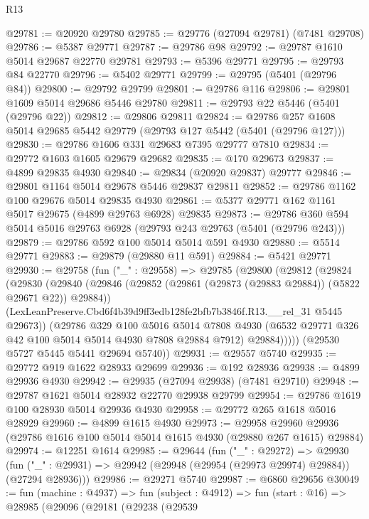 \begin{lexlean}{R13}
\begin{coremodule}
@29781 := @20920 @29780
@29785 := @29776 (@27094 @29781) (@7481 @29708)
@29786 := @5387 @29771
@29787 := @29786 @98
@29792 := @29787 @1610 @5014 @29687 @22770 @29781
@29793 := @5396 @29771
@29795 := @29793 @84 @22770
@29796 := @5402 @29771
@29799 := @29795 (@5401 (@29796 @84))
@29800 := @29792 @29799
@29801 := @29786 @116
@29806 := @29801 @1609 @5014 @29686 @5446 @29780
@29811 := @29793 @22 @5446 (@5401 (@29796 @22))
@29812 := @29806 @29811
@29824 := @29786 @257 @1608 @5014 @29685 @5442 @29779 (@29793 @127 @5442 (@5401 (@29796 @127)))
@29830 := @29786 @1606 @331 @29683 @7395 @29777 @7810
@29834 := @29772 @1603 @1605 @29679 @29682
@29835 := @170 @29673
@29837 := @4899 @29835 @4930
@29840 := @29834 (@20920 @29837) @29777
@29846 := @29801 @1164 @5014 @29678 @5446 @29837 @29811
@29852 := @29786 @1162 @100 @29676 @5014 @29835 @4930
@29861 := @5377 @29771 @162 @1161 @5017 @29675 (@4899 @29763 @6928) @29835
@29873 := @29786 @360 @594 @5014 @5016 @29763 @6928 (@29793 @243 @29763 (@5401 (@29796 @243)))
@29879 := @29786 @592 @100 @5014 @5014 @591 @4930
@29880 := @5514 @29771
@29883 := @29879 (@29880 @11 @591)
@29884 := @5421 @29771
@29930 := @29758
    (fun ("_" : @29558) =>
    @29785
      (@29800
        (@29812
          (@29824
            (@29830
              (@29840
                (@29846 (@29852 (@29861 (@29873 (@29883 @29884)) (@5822 @29671 @22)) @29884))
                (LexLeanPreserve.Cbd6f4b39d9ff3edb128fe2bfb7b3846f.R13.__rel_31 @5445 @29673))
              (@29786
                @329
                @100
                @5016
                @5014
                @7808
                @4930
                (@6532 @29771 @326 @42 @100 @5014 @5014 @4930 @7808 @29884 @7912)
                @29884)))))
      (@29530 @5727 @5445 @5441 @29694 @5740))
@29931 := @29557 @5740
@29935 := @29772 @919 @1622 @28933 @29699
@29936 := @192 @28936
@29938 := @4899 @29936 @4930
@29942 := @29935 (@27094 @29938) (@7481 @29710)
@29948 := @29787 @1621 @5014 @28932 @22770 @29938 @29799
@29954 := @29786 @1619 @100 @28930 @5014 @29936 @4930
@29958 := @29772 @265 @1618 @5016 @28929
@29960 := @4899 @1615 @4930
@29973 := @29958
    @29960
    @29936
    (@29786 @1616 @100 @5014 @5014 @1615 @4930 (@29880 @267 @1615) @29884)
@29974 := @12251 @1614
@29985 := @29644
    (fun ("_" : @29272) =>
    @29930 (fun ("_" : @29931) => @29942 (@29948 (@29954 (@29973 @29974) @29884)) (@27294 @28936)))
@29986 := @29271 @5740
@29987 := @6860 @29656
@30049 := fun (machine : @4937) =>
  fun (subject : @4912) =>
  fun (start : @16) =>
  @28985
    (@29096
      (@29181
        (@29238
          (@29539

\end{coremodule}
\end{lexlean}
